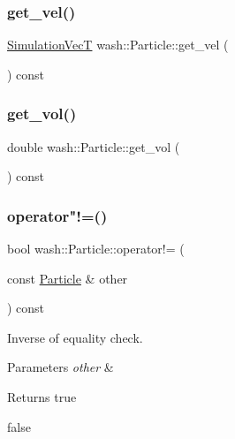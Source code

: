 \subsubsection{\texorpdfstring{get\+\_\+vel()}{get\_vel()}}
{\footnotesize\ttfamily \mbox{\hyperlink{namespacewash_ab2cbbc37941b733095c9225b49b4cad9}{Simulation\+VecT}} wash\+::\+Particle\+::get\+\_\+vel (\begin{DoxyParamCaption}{ }\end{DoxyParamCaption}) const}

\mbox{\label{classwash_1_1Particle_ab16021a2c003de07dc0a418ffc3d5eb7}} 
\subsubsection{\texorpdfstring{get\+\_\+vol()}{get\_vol()}}
{\footnotesize\ttfamily double wash\+::\+Particle\+::get\+\_\+vol (\begin{DoxyParamCaption}{ }\end{DoxyParamCaption}) const}

\mbox{\label{classwash_1_1Particle_a32f1334a8a0b273a57355956d7e9fe63}} 
\subsubsection{\texorpdfstring{operator"!=()}{operator!=()}}
{\footnotesize\ttfamily bool wash\+::\+Particle\+::operator!= (\begin{DoxyParamCaption}\item[{const \mbox{\hyperlink{classwash_1_1Particle}{Particle}} \&}]{other }\end{DoxyParamCaption}) const}



Inverse of equality check. 


\begin{DoxyParams}{Parameters}
{\em other} & \\
\hline
\end{DoxyParams}
\begin{DoxyReturn}{Returns}
true 

false 
\end{DoxyReturn}
\mbox{\label{classwash_1_1Particle_a8ac44cec043e444a45ab189f666f9d4b}} 

